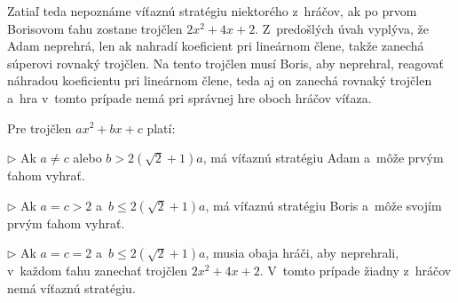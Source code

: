 {Zatiaľ teda nepoznáme víťaznú stratégiu niektorého z~hráčov, ak po prvom
Borisovom ťahu zostane trojčlen $2x^2+4x+2$. Z~predošlých úvah
vyplýva, že Adam neprehrá, len ak nahradí koeficient
pri lineárnom člene, takže zanechá súperovi rovnaký trojčlen. Na tento trojčlen
musí Boris, aby neprehral, reagovať náhradou koeficientu pri lineárnom člene,
teda aj on zanechá rovnaký trojčlen a~hra v~tomto prípade nemá pri správnej
hre oboch hráčov víťaza.

\zaver
Pre trojčlen $ax^2+bx+c$ platí:
\item{$\triangleright$} Ak $a\ne c$ alebo $b>2(\sqrt2+1)a$, má víťaznú stratégiu
Adam a~môže prvým ťahom vyhrať.
\item{$\triangleright$} Ak $a=c>2$ a~$b\le 2(\sqrt2+1)a$, má víťaznú
stratégiu Boris a~môže svojím prvým ťahom vyhrať.
\item{$\triangleright$} Ak $a=c=2$ a~$b\le 2(\sqrt2+1)a$, musia obaja hráči, aby
neprehrali, v~každom ťahu zanechať trojčlen $2x^2+4x+2$. V~tomto
prípade žiadny z~hráčov nemá víťaznú stratégiu.
}

